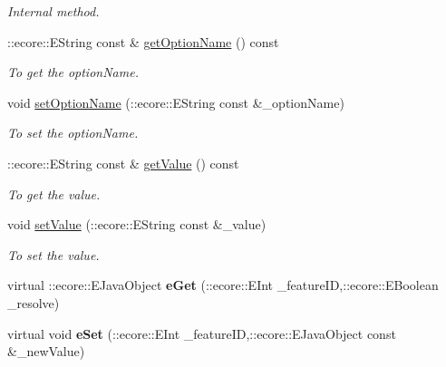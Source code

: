 \begin{DoxyCompactItemize}
\begin{DoxyCompactList}\small\item\em Internal method. \item\end{DoxyCompactList}\item 
::ecore::EString const \& \hyperlink{classUMS__Data_1_1OptionValue_a2ec5183501615e0baef5e598b1f3cd0f}{getOptionName} () const 
\begin{DoxyCompactList}\small\item\em To get the optionName. \item\end{DoxyCompactList}\item 
void \hyperlink{classUMS__Data_1_1OptionValue_aaf09a162ec6b1a317e138d87851d0d84}{setOptionName} (::ecore::EString const \&\_\-optionName)
\begin{DoxyCompactList}\small\item\em To set the optionName. \item\end{DoxyCompactList}\item 
::ecore::EString const \& \hyperlink{classUMS__Data_1_1OptionValue_a21006ca3d47ab8371557179d1689021d}{getValue} () const 
\begin{DoxyCompactList}\small\item\em To get the value. \item\end{DoxyCompactList}\item 
void \hyperlink{classUMS__Data_1_1OptionValue_a366b98552cb22267c4e2c9dc020b85e8}{setValue} (::ecore::EString const \&\_\-value)
\begin{DoxyCompactList}\small\item\em To set the value. \item\end{DoxyCompactList}\item 
\hypertarget{classUMS__Data_1_1OptionValue_ab71ab9fd616bb38505e05d55e0b676cd}{
virtual ::ecore::EJavaObject {\bfseries eGet} (::ecore::EInt \_\-featureID,::ecore::EBoolean \_\-resolve)}
\label{classUMS__Data_1_1OptionValue_ab71ab9fd616bb38505e05d55e0b676cd}

\item 
\hypertarget{classUMS__Data_1_1OptionValue_a28daacb70695c4977900127e8c7cc857}{
virtual void {\bfseries eSet} (::ecore::EInt \_\-featureID,::ecore::EJavaObject const \&\_\-newValue)}
\label{classUMS__Data_1_1OptionValue_a28daacb70695c4977900127e8c7cc857}


\end{DoxyCompactItemize}
